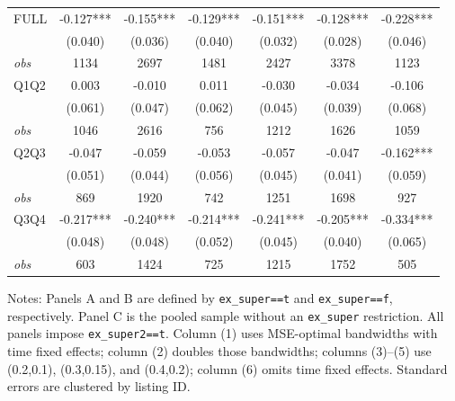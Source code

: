 \begin{table}[!htbp]
\begin{tabular}{lcccccc}
FULL & -0.127*** & -0.155*** & -0.129*** & -0.151*** & -0.128*** & -0.228*** \\
 & (0.040) & (0.036) & (0.040) & (0.032) & (0.028) & (0.046) \\
\textit{obs} & 1134 & 2697 & 1481 & 2427 & 3378 & 1123 \\
Q1Q2 & 0.003 & -0.010 & 0.011 & -0.030 & -0.034 & -0.106 \\
 & (0.061) & (0.047) & (0.062) & (0.045) & (0.039) & (0.068) \\
\textit{obs} & 1046 & 2616 & 756 & 1212 & 1626 & 1059 \\
Q2Q3 & -0.047 & -0.059 & -0.053 & -0.057 & -0.047 & -0.162*** \\
 & (0.051) & (0.044) & (0.056) & (0.045) & (0.041) & (0.059) \\
\textit{obs} & 869 & 1920 & 742 & 1251 & 1698 & 927 \\
Q3Q4 & -0.217*** & -0.240*** & -0.214*** & -0.241*** & -0.205*** & -0.334*** \\
 & (0.048) & (0.048) & (0.052) & (0.045) & (0.040) & (0.065) \\
\textit{obs} & 603 & 1424 & 725 & 1215 & 1752 & 505 \\
\bottomrule
\end{tabular}
\begin{minipage}{0.98\textwidth}\footnotesize
Notes: Panels A and B are defined by \texttt{ex\_super==t} and \texttt{ex\_super==f}, respectively. Panel C is the pooled sample without an \texttt{ex\_super} restriction. All panels impose \texttt{ex\_super2==t}. Column (1) uses MSE-optimal bandwidths with time fixed effects; column (2) doubles those bandwidths; columns (3)--(5) use (0.2,0.1), (0.3,0.15), and (0.4,0.2); column (6) omits time fixed effects. Standard errors are clustered by listing ID.
\end{minipage}
\end{table}

